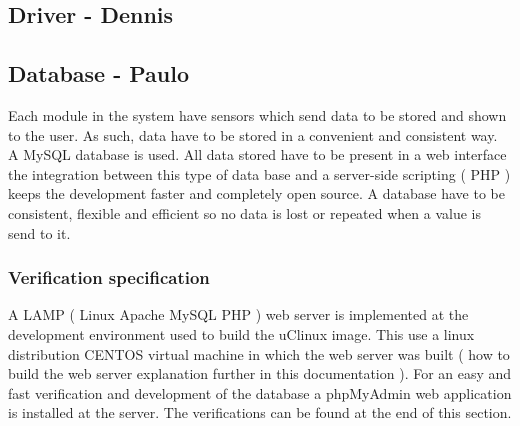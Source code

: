 \subsection{Driver - Dennis}
%			
%					
%	
%	
%	
%	
%	
%	
%	
\subsection{Database - Paulo}

Each module in the system have sensors which send data to be stored and shown to the user. As such, data have to be stored in a convenient and consistent way. A MySQL database is used. All data stored have to be present in a web interface the integration between this type of data base and a server-side scripting ( PHP ) keeps the development faster and completely open source.
A database have to be consistent, flexible and efficient so no data is lost or repeated when a value is send to it.
%
\subsubsection{Verification specification}
A LAMP ( Linux Apache MySQL PHP ) web server is implemented at the development environment used to build the uClinux image. This use a linux distribution CENTOS virtual machine in which the web server was built ( how to build the web server explanation further in this documentation ).
For an easy and fast verification and development of the database a phpMyAdmin web application is installed at the server.
The verifications can be found at the end of this section.

